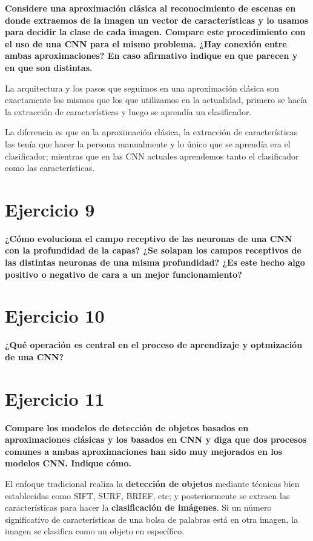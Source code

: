 \documentclass[11pt,a4paper]{article}
\begin{document}
\textbf{Considere una aproximación clásica al reconocimiento de escenas en donde extraemos de la imagen un vector de características y lo usamos para decidir la
clase de cada imagen. Compare este procedimiento con el uso de una CNN para el mismo problema. ¿Hay conexión entre ambas aproximaciones? En caso afirmativo indique
en que parecen y en que son distintas.}

La arquitectura y los pasos que seguimos en una aproximación clásica son exactamente los mismos que los que utilizamos en la actualidad, primero se hacía la
extracción de características y luego se aprendía un clasificador.

La diferencia es que en la aproximación clásica, la extracción de características las tenía que hacer la persona manualmente y lo único que se aprendía era el
clasificador; mientras que en las CNN actuales aprendemos tanto el clasificador como las características.


\section*{Ejercicio 9}

\textbf{¿Cómo evoluciona el campo receptivo de las neuronas de una CNN con la profundidad de la capas? ¿Se solapan los campos receptivos de las distintas neuronas de
una misma profundidad? ¿Es este hecho algo positivo o negativo de cara a un mejor funcionamiento?}




\section*{Ejercicio 10}

\textbf{¿Qué operación es central en el proceso de aprendizaje y optmización de una CNN?}




\section*{Ejercicio 11}

\textbf{Compare los modelos de detección de objetos basados en aproximaciones clásicas y los basados en CNN y diga que dos procesos comunes a ambas aproximaciones han
sido muy mejorados en los modelos CNN. Indique cómo.}

El enfoque tradicional realiza la \textbf{detección de objetos} mediante técnicas bien establecidas como SIFT, SURF, BRIEF, etc; y posteriormente se extraen las
características para hacer la \textbf{clasificación de imágenes}. Si un número significativo de características de una bolsa de palabras está en otra imagen, la imagen
se clasifica como un objeto en específico.
\end{document}
